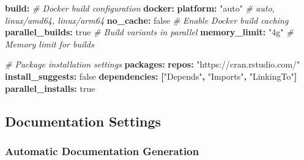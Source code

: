 \documentclass[
]{article}
\newenvironment{Shaded}{\begin{snugshade}}{\end{snugshade}}
\newcommand{\AttributeTok}[1]{\textcolor[rgb]{0.13,0.29,0.53}{#1}}
\newcommand{\CharTok}[1]{\textcolor[rgb]{0.31,0.60,0.02}{#1}}
\newcommand{\CommentTok}[1]{\textcolor[rgb]{0.56,0.35,0.01}{\textit{#1}}}
\newcommand{\FunctionTok}[1]{\textcolor[rgb]{0.13,0.29,0.53}{\textbf{#1}}}
\newcommand{\KeywordTok}[1]{\textcolor[rgb]{0.13,0.29,0.53}{\textbf{#1}}}
\newcommand{\StringTok}[1]{\textcolor[rgb]{0.31,0.60,0.02}{#1}}
\begin{document}
\begin{Shaded}
\begin{Highlighting}[]
\FunctionTok{build}\KeywordTok{:}
\CommentTok{  \# Docker build configuration}
\AttributeTok{  }\FunctionTok{docker}\KeywordTok{:}
\AttributeTok{    }\FunctionTok{platform}\KeywordTok{:}\AttributeTok{ }\StringTok{"auto"}\CommentTok{            \# auto, linux/amd64, linux/arm64}
\AttributeTok{    }\FunctionTok{no\_cache}\KeywordTok{:}\AttributeTok{ }\CharTok{false}\CommentTok{             \# Enable Docker build caching}
\AttributeTok{    }\FunctionTok{parallel\_builds}\KeywordTok{:}\AttributeTok{ }\CharTok{true}\CommentTok{       \# Build variants in parallel}
\AttributeTok{    }\FunctionTok{memory\_limit}\KeywordTok{:}\AttributeTok{ }\StringTok{"4g"}\CommentTok{          \# Memory limit for builds}

\CommentTok{  \# Package installation settings}
\AttributeTok{  }\FunctionTok{packages}\KeywordTok{:}
\AttributeTok{    }\FunctionTok{repos}\KeywordTok{:}\AttributeTok{ }\StringTok{"https://cran.rstudio.com/"}
\AttributeTok{    }\FunctionTok{install\_suggests}\KeywordTok{:}\AttributeTok{ }\CharTok{false}
\AttributeTok{    }\FunctionTok{dependencies}\KeywordTok{:}\AttributeTok{ }\KeywordTok{[}\StringTok{"Depends"}\KeywordTok{,}\AttributeTok{ }\StringTok{"Imports"}\KeywordTok{,}\AttributeTok{ }\StringTok{"LinkingTo"}\KeywordTok{]}
\AttributeTok{    }\FunctionTok{parallel\_installs}\KeywordTok{:}\AttributeTok{ }\CharTok{true}
\end{Highlighting}
\end{Shaded}

\subsection{Documentation Settings}\label{documentation-settings}

\subsubsection{Automatic Documentation
Generation}\label{automatic-documentation-generation}
\end{document}
